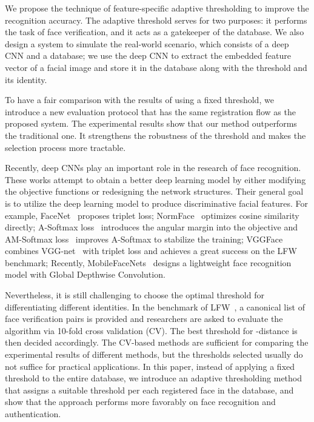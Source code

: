 \documentclass[10pt,twocolumn]{article}
\begin{document}
We propose the technique of feature-specific adaptive thresholding to improve the recognition accuracy. The adaptive threshold serves for two purposes: it performs the task of face verification, and it acts as a gatekeeper of the database. We also design a system to simulate the real-world scenario, which consists of a deep CNN and a database; we use the deep CNN to extract the embedded feature vector of a facial image and store it in the database along with the threshold and its identity.

To have a fair comparison with the results of using a fixed threshold, we introduce a new evaluation protocol that has the same registration flow as the proposed system. The experimental results show that our method outperforms the traditional one. It strengthens the robustness of the threshold and makes the selection process more tractable.

Recently, deep CNNs play an important role in the research of face recognition. These works attempt to obtain a better deep learning model by either modifying the objective functions or redesigning the network structures. Their general goal is to utilize the deep learning model to produce discriminative facial features.
For example, FaceNet~\cite{schroff2015facenet} proposes triplet loss; NormFace~\cite{wang2017normface} optimizes cosine similarity directly; A-Softmax loss~\cite{liu2017sphereface} introduces the angular margin into the objective and AM-Softmax loss~\cite{wang2018additive} improves A-Softmax to stabilize the training; VGGFace\cite{parkhi2015deep} combines VGG-net~\cite{simonyan2014very} with triplet loss and achieves a great success on the LFW benchmark; Recently, MobileFaceNets~\cite{chen2018mobilefacenets} designs a lightweight face recognition model with Global Depthwise Convolution.


Nevertheless, it is still challenging to choose the optimal threshold for differentiating different identities. In the benchmark of LFW~\cite{huang2008labeled}, a canonical list of face verification pairs is provided and researchers are asked to evaluate the algorithm via 10-fold cross validation (CV). The best threshold for -distance is then decided accordingly. The CV-based methods are sufficient for comparing the experimental results of different methods, but the thresholds selected usually do not suffice for practical applications.
In this paper, instead of applying a fixed threshold to the entire database, we introduce an adaptive thresholding method that assigns a suitable threshold per each registered face in the database, and show that the approach performs more favorably on face recognition and authentication.
\end{document}
